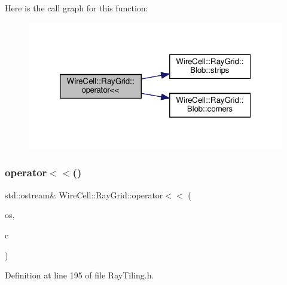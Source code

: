 Here is the call graph for this function\+:
\nopagebreak
\begin{figure}[H]
\begin{center}
\leavevmode
\includegraphics[width=320pt]{namespace_wire_cell_1_1_ray_grid_ae5aa7f167da146b7a3c08802424cdd4a_cgraph}
\end{center}
\end{figure}
\mbox{\label{namespace_wire_cell_1_1_ray_grid_aded39a1d915d9ecee3596351f1042d16}} 
\subsubsection{\texorpdfstring{operator$<$$<$()}{operator<<()}\hspace{0.1cm}{\footnotesize\ttfamily [5/5]}}
{\footnotesize\ttfamily std\+::ostream\& Wire\+Cell\+::\+Ray\+Grid\+::operator$<$$<$ (\begin{DoxyParamCaption}\item[{std\+::ostream \&}]{os,  }\item[{const \hyperlink{namespace_wire_cell_1_1_ray_grid_ad8870c962588c4492b1f7c5ad1552a7e}{Wire\+Cell\+::\+Ray\+Grid\+::crossing\+\_\+t} \&}]{c }\end{DoxyParamCaption})\hspace{0.3cm}{\ttfamily [inline]}}



Definition at line 195 of file Ray\+Tiling.\+h.

\mbox{\label{namespace_wire_cell_1_1_ray_grid_af03e98b7efe2bb929cf7d581897eff83}} 
